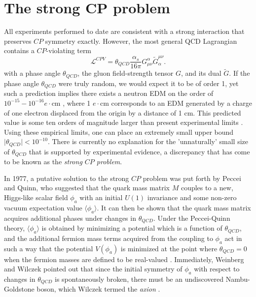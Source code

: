 \documentclass [10pt, twoside] {uwthesis}[2012/04/02]
\begin{document}
\section{The strong CP problem} %
All experiments performed to date are consistent with a strong interaction that preserves $CP$ symmetry exactly. However, the most general QCD Lagrangian contains a $CP$-violating term \begin{equation}\mathcal{L}^{CPV}=\theta_{QCD}\dfrac{\alpha_s}{16\pi}G^{\alpha}_{\mu\nu}\tilde{G}_{\alpha}^{\mu\nu}.\end{equation} with a phase angle $\theta_{QCD}$, the gluon field-strength tensor $G$, and its dual $\tilde{G}$. If the phase angle $\theta_{QCD}$ were truly random, we would expect it to be of order 1, yet such a prediction implies there exists a neutron EDM on the order of $10^{-15}-10^{-16} e\cdot \text{cm}$ \cite{1979_Baluni_nEDM_from_QCD} \cite{1979_Crewther_et._al._nEDM_from_QCD}, where 1 $e\cdot \text{cm}$ corresponds to an EDM generated by a charge of one electron displaced from the origin by a distance of 1 cm. This predicted value is some ten orders of magnitude larger than present experimental limits \cite{2006_ILL_nEDM}. Using these empirical limits, one can place an extremely small upper bound $\mid\theta_{QCD}\mid < 10^{-10}.$ There is currently no explanation for the 'unnaturally' small size of  $\theta_{QCD}$ that is supported by experimental evidence, a discrepancy that has come to be known as the \textit{strong $CP$ problem}. 

In 1977, a putative solution to the strong $CP$ problem was put forth by Peccei and Quinn, who suggested that the quark mass matrix $M$ couples to a new, Higgs-like scalar field $\phi_a$ with an initial $U(1)$ invariance and some non-zero vacuum expectation value $\langle\phi_a\rangle$. It can then be shown that the quark mass matrix acquires additional phases under changes in $\theta_{QCD}$. Under the Peccei-Quinn theory, $\langle\phi_a\rangle$ is obtained by minimizing a potential which is a function of $\theta_{QCD}$, and the additional fermion mass terms acquired from the coupling to $\phi_a$ act in such a way that the potential $V(\phi_a)$ is minimized at the point where $\theta_{QCD} = 0$ when the fermion masses are defined to be real-valued \cite{1977_Peccei_Quinn}. Immediately, Weinberg and Wilczek pointed out that since the initial symmetry of $\phi_a$ with respect to changes in $\theta_{QCD}$ is spontaneously broken, there must be an undiscovered Nambu-Goldstone boson, which Wilczek termed the \textit{axion} \cite{1978_Wilczek_axion}\cite{1978_Weinberg_axion}. 
\end{document}
